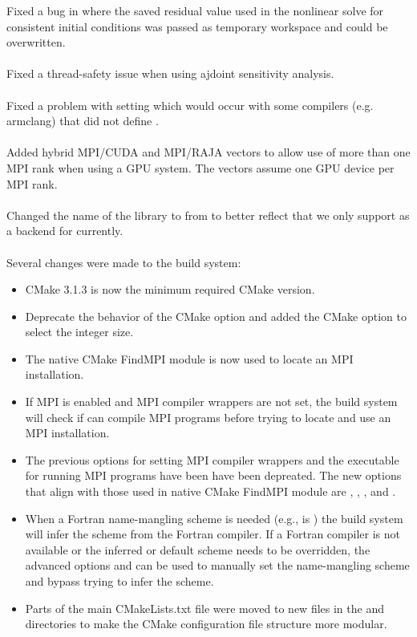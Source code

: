 Fixed a bug in {\idas} where the saved residual value used in the nonlinear
solve for consistent initial conditions was passed as temporary workspace and
could be overwritten.
\\
\\
\noindent Fixed a thread-safety issue when using ajdoint sensitivity analysis.
\\
\\
\noindent Fixed a problem with setting  which would occur
with some compilers (e.g. armclang) that did not define .
\\
\\
\noindent Added hybrid MPI/CUDA and MPI/RAJA vectors to allow use of more
than one MPI rank when using a GPU system.  The vectors assume one GPU
device per MPI rank.
\\
\\
\noindent Changed the name of the {\raja} {\nvector} library to
 from \newline
{} to better reflect that we only support {\cuda}
as a backend for {\raja} currently.
\\
\\
\noindent Several changes were made to the build system:
\begin{itemize}
\item CMake 3.1.3 is now the minimum required CMake version.
\item Deprecate the behavior of the  CMake option and
  added the \newline
   CMake option to select the 
  integer size.
\item The native CMake FindMPI module is now used to locate an MPI installation.
\item If MPI is enabled and MPI compiler wrappers are not set, the build system
  will check if  can compile MPI programs before
  trying to locate and use an MPI installation.
\item The previous options for setting MPI compiler wrappers and the executable
  for running MPI programs have been have been depreated. The new options that
  align with those used in native CMake FindMPI module are
  , , ,
  and .
\item When a Fortran name-mangling scheme is needed (e.g., 
  is ) the build system will infer the scheme from the Fortran
  compiler. If a Fortran compiler is not available or the inferred or default
  scheme needs to be overridden, the advanced options
   and  can
  be used to manually set the name-mangling scheme and bypass trying to infer
  the scheme.
\item Parts of the main CMakeLists.txt file were moved to new files in the
   and  directories to make the CMake configuration file
  structure more modular.
\end{itemize}


